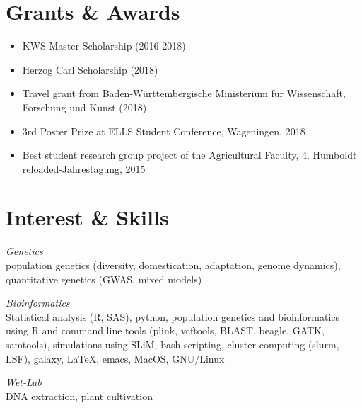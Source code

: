\documentclass[margin,10pt,a4paper]{res}
\begin{document}
\begin{resume}

\section{Grants \& Awards} 
\begin{itemize}\itemsep -2pt %
\item KWS Master Scholarship (2016-2018)
\item Herzog Carl Scholarship (2018)
\item Travel grant from Baden-Württembergische Ministerium für Wissenschaft, Forschung und Kunst (2018)
\item 3rd Poster Prize at ELLS Student Conference, Wageningen, 2018
\item Best student research group project of the Agricultural Faculty, 4. Humboldt reloaded-Jahrestagung, 2015
\end{itemize}



\section{Interest \& Skills } 

{\sl{Genetics}}\\
population genetics (diversity, domestication, adaptation, genome dynamics), quantitative genetics (GWAS, mixed models)
 
{\sl{Bioinformatics}}\\
Statistical analysis (\textsf{R}, \textsc{SAS}), python, population genetics and bioinformatics using \textsf{R} and command line tools (plink, vcftools, BLAST, beagle, GATK, samtools), simulations using SLiM, bash scripting, cluster computing (slurm, LSF), galaxy, \LaTeX, emacs, MacOS, GNU/Linux

{\sl{Wet-Lab}}\\
DNA extraction, plant cultivation



\end{resume}
\end{document}
